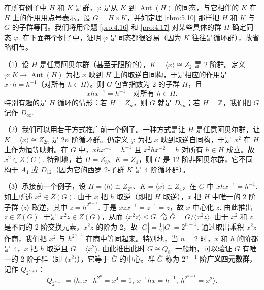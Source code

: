 \begin{example}
在所有例子中 \(H\) 和 \(K\) 是群，\(\varphi\) 是从 \(K\) 到 \(\operatorname{Aut}(H)\) 的同态，与它相伴的 \(K\) 在 \(H\) 上的作用用点号表示。设 \(G = H \rtimes K\)，并如定理 \ref{thm:5.10} 那样把 \(H\) 和 \(K\) 与 \(G\) 的子群等同。我们将用命题 \ref{pro:4.16} 和 \ref{pro:4.17} 对某些具体的群 \(H\) 确定同态 \(\varphi\). 在下面每个例子中，证明 \(\varphi\) 是同态都很容易（因为 \(K\) 往往是循环群），故省略细节。

（1）设 \(H\) 是任意阿贝尔群（甚至无限阶的），\(K = \langle x \rangle \cong Z_2\) 是 2 阶群。定义 \(\varphi : K \to \operatorname{Aut}(H)\) 为把 \(x\) 映到 \(H\) 上的取逆自同构，于是相应的作用是 \(x \cdot h = h^{-1}\)（对所有 \(h \in H\)）。则 \(G\) 包含指数为 2 的子群 \(H\)，且
\[
xhx^{-1} = h^{-1} \quad \text{对所有 } h \in H.
\]
特别有趣的是 \(H\) 循环的情形：若 \(H = Z_n\)，则 \(G\) 就是 \(D_{2n}\)；若 \(H = \mathbb{Z}\)，我们把 \(G\) 记作 \(D_\infty\).

（2）我们可以用若干方式推广前一个例子。一种方式是让 \(H\) 是任意阿贝尔群，让 \(K = \langle x \rangle \cong Z_{2n}\) 是 \(2n\) 阶循环群。仍定义 \(\varphi\) 为把 \(x\) 映到取逆自同构，于是 \(x^2\) 在 \(H\) 上作为恒等映射。在 \(G\) 中，\(xhx^{-1} = h^{-1}\) 且 \(x^2hx^{-2} = h\) 对所有 \(h \in H\) 成立。故 \(x^2 \in Z(G)\). 特别地，若 \(H = Z_3\)、\(K = Z_4\)，则 \(G\) 是 12 阶非阿贝尔群，它不同构于 \(A_4\) 或 \(D_{12}\)（因为它的西罗 2-子群 \(K\) 是 4 阶循环群）。

（3）承接前一个例子，设 \(H = \langle h \rangle \cong Z_{2^n}\)、\(K = \langle x \rangle \cong Z_4\)，在 \(G\) 中 \(xhx^{-1} = h^{-1}\). 如上所述 \(x^2 \in Z(G)\). 由于 \(x\) 把 \(h\) 取逆（即把 \(H\) 取逆），\(x\) 把 \(H\) 中唯一的 2 阶子群 \(\langle z \rangle\) 取逆，其中 \(z = h^{2^{n-1}}\). 于是 \(xzx^{-1} = z^{-1} = z\)，故 \(x\) 中心化 \(z\). 由此推出 \(z \in Z(G)\). 于是 \(x^2z \in Z(G)\)，从而 \(\langle x^2z \rangle \trianglelefteq G\). 令 \(\bar{G} = G/\langle x^2z \rangle\). 由于 \(x^2\) 和 \(z\) 是不同的 2 阶交换元素，\(x^2z\) 的阶为 2，故 \(|\bar{G}| = \frac{1}{2}|G| = 2^{n+1}\). 通过取出乘积 \(x^2z\) 作商，我们把 \(x^2\) 与 \(h^{2^{n-1}}\) 在商中等同起来。特别地，当 \(n = 2\) 时，\(x\) 和 \(h\) 的阶都是 4，\(x\) 把 \(h\) 取逆且 \(\bar{G} = \langle x^2 \rangle\). 由此推出此时 \(\bar{G} \cong Q_8\). 一般地，可以验证 \(\bar{G}\) 有唯一的 2 阶子群（即 \(\langle x^2 \rangle\)），它等于 \(\bar{G}\) 的中心。群 \(\bar{G}\) 称为 \(2^{n+1}\) 阶\textbf{广义四元数群}，记作 \(Q_{2^{n+1}}\)：
\[
Q_{2^{n+1}} = \langle h, x \mid h^{2^n} = x^4 = 1,\ x^{-1}hx = h^{-1},\ h^{2^{n-1}} = x^2 \rangle.
\]


\end{example}
